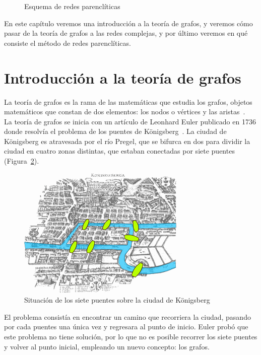 \begin{figure}[htbp!]
	\begin{center}
		\resizebox{\textwidth}{!}{%
			\redesparencliticas
		}
	\end{center}
	\caption{Esquema de redes parenclíticas}
	\label{fig:redesparencliticas}
\end{figure}

En este capítulo veremos una introducción a la teoría de grafos, y veremos cómo pasar de la teoría de grafos a las redes complejas, y por último veremos en qué consiste el método de redes parenclíticas.

\section{Introducción a la teoría de grafos}

La teoría de grafos es la rama de las matemáticas que estudia los grafos, objetos matemáticos que constan de dos elementos: los nodos o vértices y las aristas~\cite{opac-b1093081}.\\

La teoría de grafos se inicia con un artículo de Leonhard Euler publicado en 1736 donde resolvía el problema de los puentes de Königsberg~\cite{Euler1736}. La ciudad de Königsberg es atravesada por el río Pregel, que se bifurca en dos para dividir la ciudad en cuatro zonas distintas, que estaban conectadas por siete puentes (Figura~\ref{fig:bridges}).\\

\begin{figure}[htbp!]
\centering
\includegraphics[width=0.6\linewidth]{imagenes/bridges}
\caption{Situación de los siete puentes sobre la ciudad de Königsberg}
\label{fig:bridges}
\end{figure}

El problema consistía en encontrar un camino que recorriera la ciudad, pasando por cada puentes una única vez y regresara al punto de inicio. Euler probó que este problema no tiene solución, por lo que no es posible recorrer los siete puentes y volver al punto inicial, empleando un nuevo concepto: los grafos.\\

